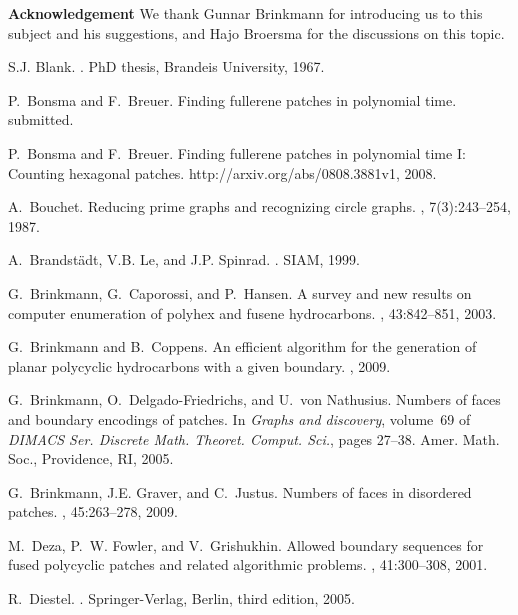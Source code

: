 \documentclass{llncs}
\begin{document}
\noindent
{\bf Acknowledgement} We thank Gunnar Brinkmann for introducing us to this subject and his suggestions, and Hajo Broersma for the discussions on this topic.
\begin{thebibliography}{10}

S.J. Blank.
.
\newblock PhD thesis, Brandeis University, 1967.

P.~Bonsma and F.~Breuer.
\newblock Finding fullerene patches in polynomial time.
\newblock submitted.

P.~Bonsma and F.~Breuer.
\newblock Finding fullerene patches in polynomial time {I}: Counting hexagonal
  patches.
\newblock http://arxiv.org/abs/0808.3881v1, 2008.

A.~Bouchet.
\newblock Reducing prime graphs and recognizing circle graphs.
, 7(3):243--254, 1987.

A.~Brandst\"{a}dt, V.B. Le, and J.P. Spinrad.
.
\newblock SIAM, 1999.

G.~Brinkmann, G.~Caporossi, and P.~Hansen.
\newblock A survey and new results on computer enumeration of polyhex and
  fusene hydrocarbons.
, 43:842--851, 2003.

G.~Brinkmann and B.~Coppens.
\newblock An efficient algorithm for the generation of planar polycyclic
  hydrocarbons with a given boundary.
, 2009.

G.~Brinkmann, O.~Delgado-Friedrichs, and U.~von Nathusius.
\newblock Numbers of faces and boundary encodings of patches.
\newblock In {\em Graphs and discovery}, volume~69 of {\em DIMACS Ser. Discrete
  Math. Theoret. Comput. Sci.}, pages 27--38. Amer. Math. Soc., Providence, RI,
  2005.

G.~Brinkmann, J.E. Graver, and C.~Justus.
\newblock Numbers of faces in disordered patches.
, 45:263--278, 2009.

M.~Deza, P.~W. Fowler, and V.~Grishukhin.
\newblock Allowed boundary sequences for fused polycyclic patches and related
  algorithmic problems.
, 41:300--308, 2001.

R.~Diestel.
.
\newblock Springer-Verlag, Berlin, third edition, 2005.


\end{thebibliography}
\end{document}

